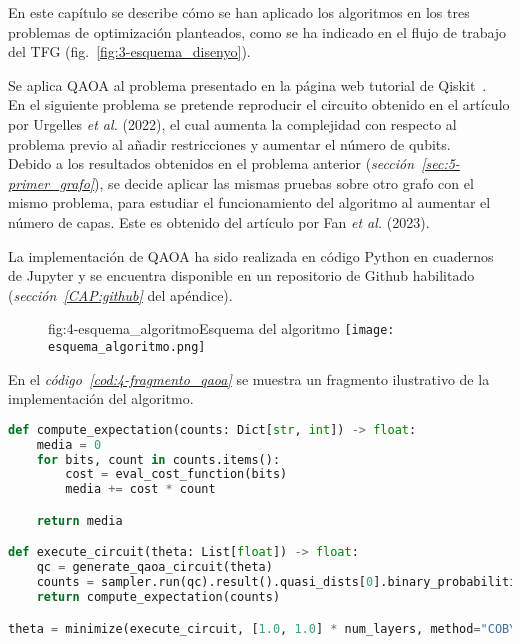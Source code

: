 
En este capítulo se describe cómo se han aplicado los algoritmos en los tres problemas de optimización planteados, como se ha indicado en el flujo de trabajo del TFG (fig.~\ref{fig:3-esquema_disenyo}).

Se aplica QAOA al problema presentado en la página web tutorial de Qiskit~\cite{qiskit_tutorial_antiguo}.
\\
En el siguiente problema se pretende reproducir el circuito obtenido en el artículo por Urgelles \textit{et al.} (2022)\cite{multi-objective_routing_optimization}, el cual aumenta la complejidad con respecto al problema previo al añadir restricciones y aumentar el número de qubits.
\\
Debido a los resultados obtenidos en el problema anterior (\textit{sección~\ref{sec:5-primer_grafo}}), se decide aplicar las mismas pruebas sobre otro grafo con el mismo problema, para estudiar el funcionamiento del algoritmo al aumentar el número de capas.
Este es obtenido del artículo por Fan \textit{et al.} (2023)\cite{solving_shortest_path_with_qaoa}.

La implementación de QAOA ha sido realizada en código Python en cuadernos de Jupyter y se encuentra disponible en un repositorio de Github habilitado (\textit{sección~\ref{CAP:github}} del apéndice).

\begin{figure}[Esquema del algoritmo]{fig:4-esquema_algoritmo}{Esquema del algoritmo}
  \centering
  \texttt{[image: esquema\_algoritmo.png]}
\end{figure}

En el \textit{código~\ref{cod:4-fragmento_qaoa}} se muestra un fragmento ilustrativo de la implementación del algoritmo.

\newpage

\begin{lstlisting}[language=Python,label=cod:4-fragmento_qaoa,caption={Fragmento de código de una ejecución de QAOA.},style=numbered]
def compute_expectation(counts: Dict[str, int]) -> float:
    media = 0
    for bits, count in counts.items():
        cost = eval_cost_function(bits)
        media += cost * count

    return media

def execute_circuit(theta: List[float]) -> float:
    qc = generate_qaoa_circuit(theta)
    counts = sampler.run(qc).result().quasi_dists[0].binary_probabilities()
    return compute_expectation(counts)

theta = minimize(execute_circuit, [1.0, 1.0] * num_layers, method="COBYLA")
\end{lstlisting}

